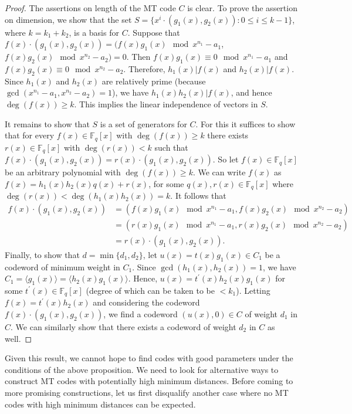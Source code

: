 \documentclass[preprint,12pt]{elsarticle}
\newcommand{\Fq}{\mathbb{F}_q}
\begin{document}
\begin{proof}

The assertions on length of the MT code $C$ is clear. To prove the assertion on dimension, we show that the set $S=\{x^i\cdot (g_1(x),g_2(x)): 0\leq i\leq k-1\}$, where $k=k_1+k_2$, is a basis for $C$. Suppose that $f(x)\cdot (g_1(x),g_2(x))=(f(x)g_1(x)\mod x^{n_1}-a_1$, $f(x)g_2(x)\mod x^{n_2}-a_2)=0.$ Then
 $f(x)g_1(x) \equiv 0 \mod x^{n_1}-a_1 $ and $f(x)g_2(x) \equiv 0 \mod x^{n_2}-a_2 $. Therefore, $h_1(x)|f(x)$ and $h_2(x)|f(x)$. Since $h_1(x)$ and $h_2(x)$ are relatively prime (because $\gcd(x^{n_1}-a_1,x^{n_2}-a_2)=1$), we have $h_1(x)h_2(x)|f(x)$, and hence $\deg(f(x))\geq k$. This implies the linear independence of vectors in $S$. 
 
 It remains to show that $S$ is a set of generators for $C$. For this it suffices to show that for every $f(x)\in \Fq[x]$ with $\deg(f(x))\geq k$ there exists $r(x)\in \Fq[x]$ with $\deg(r(x))< k$ such that $f(x)\cdot (g_1(x),g_2(x))=r(x)\cdot (g_1(x),g_2(x)).$ 
So let $f(x)\in \Fq[x]$ be an arbitrary polynomial with $\deg(f(x))\geq k$. We can write $f(x)$ as $f(x)=h_1(x)h_2(x)q(x)+r(x)$, for some $q(x),r(x)\in \Fq[x]$ where $\deg(r(x))< \deg(h_1(x)h_2(x))=k$. It follows that
\begin{align*}
f(x)\cdot (g_1(x),g_2(x))&=(f(x)g_1(x)\mod x^{n_1}-a_1, f(x)g_2(x)\mod x^{n_2}-a_2)\\
                          &=(r(x)g_1(x)\mod x^{n_1}-a_1, r(x)g_2(x)\mod x^{n_2}-a_2)\\
                          &=r(x)\cdot (g_1(x),g_2(x)).
\end{align*}
Finally, to show that $d=\min\{d_1,d_2\}$, let $u(x)=t(x)g_1(x)\in C_1$ be a codeword of minimum weight in $C_1$. Since $\gcd(h_1(x),h_2(x))=1$, we have $C_1=\langle g_1(x)\rangle = \langle h_2(x)g_1(x)\rangle$. Hence,  $u(x)=t^{\prime}(x)h_2(x)g_1(x)$ for some $t^{\prime}(x) \in \Fq[x]$ (degree of which can be taken to be $<k_1$). Letting $f(x)=t^{\prime}(x)h_2(x)$ and considering the codeword $f(x)\cdot (g_1(x),g_2(x))$, we find a codeword $(u(x),0)\in C$  of weight $d_1$ in $C$. We can similarly show that there exists a codeword of weight $d_2$ in $C$ as well.    
\end{proof}

 Given this result, we cannot hope to find codes with good parameters under the conditions of the above proposition. We need to look for alternative ways to construct MT codes with potentially high minimum distances. Before coming to more promising constructions, let us first disqualify another case where no MT codes with high minimum distances can be expected.
\end{document}
